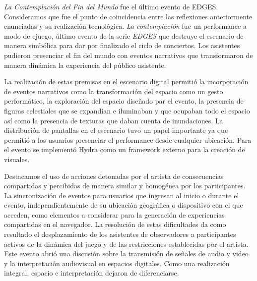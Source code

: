 \textit{La Contemplación del Fin del Mundo} fue el último evento de EDGES. Consideramos que fue el punto de coincidencia entre las reflexiones anteriormente enunciadas y su realización tecnológica. \textit{La contemplación} fue un performance a modo de ejuego, último evento de la serie \textit{EDGES} que destruye el escenario de manera simbólica para dar por finalizado el ciclo de conciertos. Los asistentes pudieron presenciar el fin del mundo con eventos narrativos que transformaron de manera dinámica la experiencia del público asistente. 

La realización de estas premisas en el escenario digital permitió la incorporación de eventos narrativos como la transformación del espacio como un gesto performático, la exploración del espacio diseñado par el evento, la presencia de figuras celestiales que se expandían e iluminaban y que ocupaban todo el espacio así como la presencia de texturas que daban cuenta de inundaciones. La distribución de pantallas en el escenario tuvo un papel importante ya que permitió a los usuarios presenciar el performance desde cualquier ubicación. Para el evento se implementó Hydra \citep{hydra} como un framework externo para la creación de visuales.


Destacamos el uso de acciones detonadas por el artista de consecuencias compartidas y percibidas de manera similar y homogénea por los participantes. La sincronización de eventos para usuarios que ingresan al inicio o durante el evento, independientemente de su ubicación geográfica o dispositivo con el que acceden, como elementos a considerar para la generación de experiencias compartidas en el navegador. La resolución de estas dificultades da como resultado el desplazamiento de los asistentes de observadores a participantes activos de la dinámica del juego y de las restricciones establecidas por el artista. Este evento abrió una discusión sobre la transmisión de señales de audio y video y la interpretación audiovisual en espacios digitales. Como una realización integral, espacio e interpretación dejaron de diferenciarse. 

